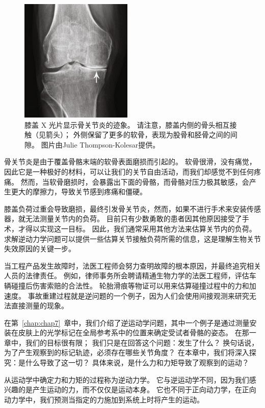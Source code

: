\begin{figure}[!htb]
	\centering
	\includegraphics[width=0.4\linewidth]{chap8/8_1}
	\caption{膝盖 X 光片显示骨关节炎的迹象。
		请注意，膝盖内侧的骨头相互接触（见箭头）；
		外侧保留了更多的软骨，表现为股骨和胫骨之间的间隙。
		图片由Julie Thompson-Kolesar提供。 \label{fig:8_1}}
\end{figure}


骨关节炎是由于覆盖骨骼末端的软骨表面磨损而引起的。
软骨很滑，没有痛觉，因此它是一种极好的材料，可以让我们的关节自由活动，而我们却感觉不到任何疼痛。
然而，当软骨磨损时，会暴露出下面的骨骼，而骨骼对压力极其敏感，会产生更大的摩擦力，导致关节感到疼痛和僵硬。


膝盖负荷过重会导致磨损，最终引发骨关节炎，然而，如果不进行手术来安装传感器，就无法测量关节内的负荷。
目前只有少数勇敢的患者因其他原因接受了手术，才得以实现这一目标。
因此，我们通常采用其他方法来估算关节内的负荷。
求解逆动力学问题可以提供一些估算关节接触负荷所需的信息，这是理解生物关节失效原因的关键一步。


当工程产品发生故障时，法医工程师会努力查明故障的根本原因，并最终追究相关人员的法律责任。
例如，律师事务所会聘请精通生物力学的法医工程师，评估车辆碰撞后伤害索赔的合法性。
轮胎滑痕等物证可以用来估算碰撞过程中的力和加速度。
事故重建过程就是逆问题的一个例子，因为人们会使用间接观测来研究无法直接测量的现象。


在第~\ref{chap:chap7}~章中，我们介绍了逆运动学问题，其中一个例子是通过测量安装在皮肤上的光学标记在全局参考系中的位置来确定受试者骨骼的姿态。
在那一章中，我们的目标很有限；
我们只是在回答这个问题：发生了什么？
换句话说，为了产生观察到的标记轨迹，必须存在哪些关节角度？
在本章中，我们将深入探究：是什么导致了这一切？
具体来说，是什么力和力矩导致了观察到的运动？


从运动学中确定力和力矩的过程称为逆动力学。
它与逆运动学不同，因为我们感兴趣的是产生运动的力，而不仅仅是运动本身。
它也不同于正向动力学，在正向动力学中，我们预测当指定的力施加到系统上时将产生的运动。


